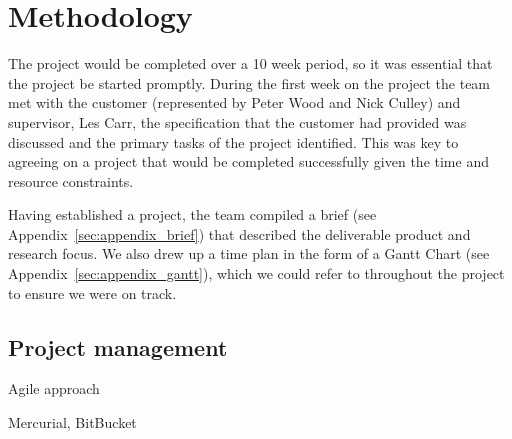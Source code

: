\section{Methodology}

The project would be completed over a 10 week period, so it was essential that the project be started promptly. During the first week on the project the team met with the customer (represented by Peter Wood and Nick Culley) and supervisor, Les Carr, the specification that the customer had provided was discussed and the primary tasks of the project identified. This was key to agreeing on a project that would be completed successfully given the time and resource constraints.

Having established a project, the team compiled a brief (see Appendix~\ref{sec:appendix_brief}) that described the deliverable product and research focus. We also drew up a time plan in the form of a Gantt Chart (see Appendix~\ref{sec:appendix_gantt}), which we could refer to throughout the project to ensure we were on track.

\subsection{Project management}

Agile approach

Mercurial, BitBucket
 
